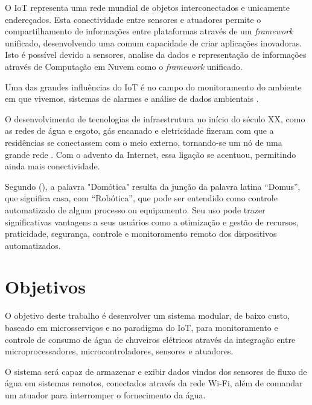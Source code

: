 O IoT representa uma rede mundial de objetos interconectados e unicamente endereçados. Esta conectividade entre sensores e atuadores permite o compartilhamento de informações entre plataformas através de um \textit{framework} unificado, desenvolvendo uma comum capacidade de criar aplicações inovadoras. Isto é possível devido a sensores, analise da dados e representação de informações através de Computação em Nuvem como o \textit{framework} unificado. \cite{RisteskaStojkoska2017}

Uma das grandes influências do IoT é no campo do monitoramento do ambiente em que vivemos, sistemas de alarmes e análise de dados ambientais \cite{Perumal2016}. %

O desenvolvimento de tecnologias de infraestrutura no início do século XX, como as redes de água e esgoto, gás encanado e eletricidade fizeram com que a residências se conectassem com o meio externo, tornando-se um nó de uma grande rede \cite{forty2007objetos}. Com o advento da Internet, essa ligação se acentuou, permitindo ainda mais conectividade. \cite{VarelaDeSouza} 

Segundo \citeauthor{VarelaDeSouza} (\citeyear{VarelaDeSouza}), a palavra "Domótica" resulta da junção da palavra latina
“Domus”, que significa casa, com “Robótica”, que pode ser entendido como controle automatizado de algum processo ou equipamento. Seu uso pode trazer significativas vantagens a seus usuários como a otimização e gestão de recursos, praticidade, segurança, controle e monitoramento remoto dos dispositivos automatizados.



\section{Objetivos}

O objetivo deste trabalho é desenvolver um sistema modular, de baixo custo, baseado em microsserviços e no paradigma do IoT, para monitoramento e controle de consumo de água de chuveiros elétricos através da integração entre microprocessadores, microcontroladores, sensores e atuadores. 

O sistema será capaz de armazenar e exibir dados vindos dos sensores de fluxo de água em sistemas remotos, conectados através da rede Wi-Fi, além de comandar um atuador para interromper o fornecimento da água.

